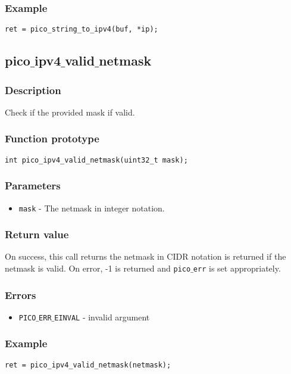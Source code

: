 \subsubsection*{Example}
\begin{verbatim}
ret = pico_string_to_ipv4(buf, *ip);
\end{verbatim}


\subsection{pico$\_$ipv4$\_$valid$\_$netmask}

\subsubsection*{Description}
Check if the provided mask if valid.

\subsubsection*{Function prototype}
\begin{verbatim}
int pico_ipv4_valid_netmask(uint32_t mask);
\end{verbatim}

\subsubsection*{Parameters}
\begin{itemize}[noitemsep]
\item \texttt{mask} - The netmask in integer notation.
\end{itemize}

\subsubsection*{Return value}
On success, this call returns the netmask in CIDR notation is returned if the netmask is valid.
On error, -1 is returned and \texttt{pico$\_$err} is set appropriately.

\subsubsection*{Errors}
\begin{itemize}[noitemsep]
\item \texttt{PICO$\_$ERR$\_$EINVAL} - invalid argument
\end{itemize}

\subsubsection*{Example}
\begin{verbatim}
ret = pico_ipv4_valid_netmask(netmask);
\end{verbatim}


